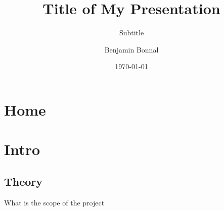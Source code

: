 \documentclass[simple]{coilchainpres}
\title[Title]{Title of My Presentation}
\subtitle{Subtitle}
\author[coilchain]{Benjamin Bonnal}
\institute[coilchain]{\texttt{[image: logo]}}
\date{\today}
\begin{document}
\section{Home}
\begin{frame}
	\titlepage
\end{frame}

\section{Intro}
\subsection{Theory}
\begin{frame}{What is the scope of the project}


\end{frame}
\end{document}
